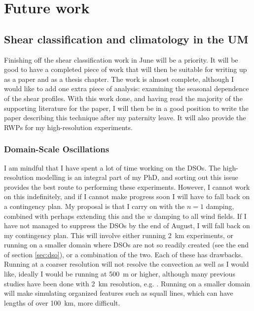 \documentclass[11pt,a4paper]{article}
\begin{document}
\section{Future work}
\label{sec:Future work}

\subsection{Shear classification and climatology in the UM}
\label{sec:Shear climatology in the UM}
Finishing off the shear classification work in June will be a priority. It will be good to have a completed piece of work that will then be suitable for writing up as a paper and as a thesis chapter. The work is almost complete, although I would like to add one extra piece of analysis: examining the seasonal dependence of the shear profiles. With this work done, and having read the majority of the supporting literature for the paper, I will then be in a good position to write the paper describing this technique after my paternity leave. It will also provide the RWPs for my high-resolution experiments.

\subsubsection{Domain-Scale Oscillations}
\label{sec:dso_future}
I am mindful that I have spent a lot of time working on the DSOs. The high-resolution modelling is an integral part of my PhD, and sorting out this issue provides the best route to performing these experiments. However, I cannot work on this indefinitely, and if I cannot make progress soon I will have to fall back on a contingency plan. My proposal is that I carry on with the $n = 1$ damping, combined with perhaps extending this and the $w$ damping to all wind fields. If I have not managed to suppress the DSOs by the end of August, I will fall back on my contingency plan. This will involve either running \SI{2}{km} experiments, or running on a smaller domain where DSOs are not so readily created (see the end of section \ref{sec:dso}), or a combination of the two. Each of these has drawbacks. Running at a coarser resolution will not resolve the convection as well as I would like, ideally I would be running at \SI{500}{m} or higher, although many previous studies have been done with \SI{2}{km} resolution, e.g. \cite{tompkins2017organization}. Running on a smaller domain will make simulating organized features such as squall lines, which can have lengths of over \SI{100}{km}, more difficult.
\end{document}
